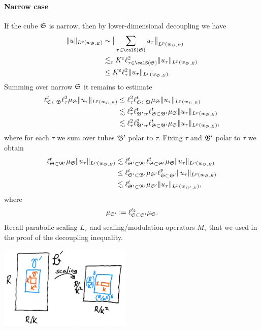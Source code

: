 \paragraph{Narrow case}
If the cube $\mathfrak{S}$ is narrow, then by lower-dimensional decoupling we have
\begin{align*}
\norm{u}_{L^p(w_{\bS,E})}
&\sim
\norm[\big]{\sum_{\tau\in \calS(\bS)}u_\tau}_{L^p(w_{\bS,E})}\\
&\lesssim_{\epsilon} K^{\epsilon}
\ell^{2}_{\tau\in \calS(\bS)} \norm{u_\tau}_{L^p(w_{\bS,E})}\\
&\leq K^{\epsilon}
\ell^{2}_{\tau} \norm{u_\tau}_{L^p(w_{\bS,E})}.
\end{align*}
Summing over narrow $\mathfrak{S}$ it remains to estimate
\begin{align*}
\ell^{t}_{\mathfrak{S} \subset \mathfrak{B}} \ell^{2}_{\tau} \mu_{\mathfrak{S}} \lVert u_{\tau} \rVert_{L^{p}(w_{\mathfrak{S},E})}
&\leq
\ell^{2}_{\tau} \ell^{t}_{\mathfrak{S} \subset \mathfrak{B}} \mu_{\mathfrak{S}} \lVert u_{\tau} \rVert_{L^{p}(w_{\mathfrak{S},E})}\\
&\lesssim
\ell^{2}_{\tau} \ell^{t}_{\mathfrak{B}' : \tau} \ell^{t}_{\mathfrak{S} \subset \mathfrak{B}'} \mu_{\mathfrak{S}} \lVert u_{\tau} \rVert_{L^{p}(w_{\mathfrak{S},E})}\\
&\lesssim
\ell^{2}_{\tau} \ell^{2}_{\mathfrak{B}' : \tau} \ell^{t}_{\mathfrak{S} \subset \mathfrak{B}'} \mu_{\mathfrak{S}} \lVert u_{\tau} \rVert_{L^{p}(w_{\mathfrak{S},E})},
\end{align*}
where for each $\tau$ we sum over tubes $\mathfrak{B}'$ polar to $\tau$.
Fixing $\tau$ and $\mathfrak{B}'$ polar to $\tau$ we obtain
\begin{equation} \label{eq:fixed-Box-norm2}
\begin{split}
\ell^{t}_{\mathfrak{S} \subset \mathfrak{B}'} \mu_{\mathfrak{S}} \lVert u_{\tau} \rVert_{L^{p}(w_{\mathfrak{S},E})}
&\lesssim
\ell^{t}_{\mathfrak{S}' \subset \mathfrak{B}'} \ell^{t}_{\mathfrak{S} \subset \mathfrak{S}'} \mu_{\mathfrak{S}} \lVert u_{\tau} \rVert_{L^{p}(w_{\mathfrak{S},E})}\\
&\leq
\ell^{t}_{\mathfrak{S}' \subset \mathfrak{B}'} \mu_{\mathfrak{S}'} \ell^{p}_{\mathfrak{S} \subset \mathfrak{S}'} \lVert u_{\tau} \rVert_{L^{p}(w_{\mathfrak{S},E})}\\
&\lesssim
\ell^{t}_{\mathfrak{S}' \subset \mathfrak{B}'} \mu_{\mathfrak{S}'} \lVert u_{\tau} \rVert_{L^{p}(w_{\mathfrak{S}',E})},
\end{split}
\end{equation}
where
\[
\mu_{\mathfrak{S}'} := \ell^{t_{2}}_{\mathfrak{S} \subset \mathfrak{S}'} \mu_{\mathfrak{S}}.
\]
Recall parabolic scaling $L_{\tau}$ and scaling/modulation operators $M_{\tau}$ that we used in the proof of the decoupling inequality.
\begin{center}
\includegraphics[height=4cm]{max-schroedinger-scaling.png}
\end{center}
